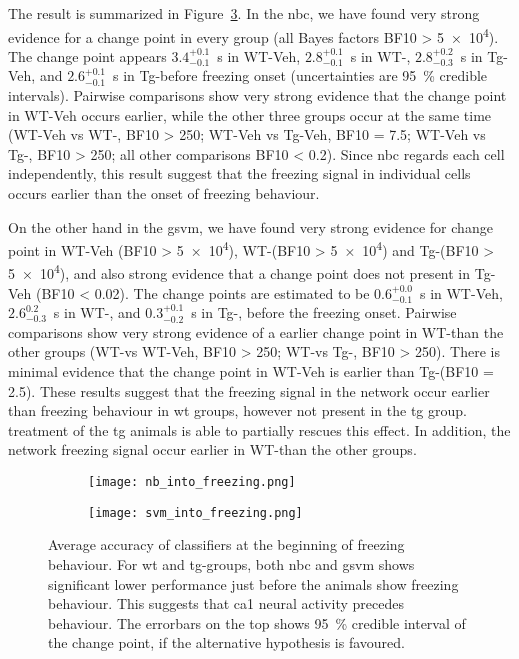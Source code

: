 The result is summarized in Figure~\ref{f.ad.into_f}. In the \gls{nbc}, we have found very strong evidence for a change point in every group (all Bayes factors BF10 > \num{5e4}). The change point appears $3.4_{-0.1}^{+0.1}$\SI{}{\s} in WT-Veh, $2.8_{-0.1}^{+0.1}$\SI{}{\second} in WT-\glu, $2.8_{-0.3}^{+0.2}$\SI{}{\second} in Tg-Veh, and $2.6_{-0.1}^{+0.1}$\SI{}{\second} in Tg-\glu before freezing onset (uncertainties are \SI{95}{\percent} credible intervals). Pairwise comparisons show very strong evidence that the change point in WT-Veh occurs earlier, while the other three groups occur at the same time (WT-Veh vs WT-\glu, BF10 > \num{250}; WT-Veh vs Tg-Veh, BF10 = \num{7.5}; WT-Veh vs Tg-\glu, BF10 > \num{250}; all other comparisons BF10 < \num{0.2}). Since \gls{nbc} regards each cell independently, this result suggest that the freezing signal in individual cells occurs earlier than the onset of freezing behaviour.

On the other hand in the \gls{gsvm}, we have found very strong evidence for change point in WT-Veh (BF10 > \num{5e4}), WT-\glu (BF10 > \num{5e4}) and Tg-\glu (BF10 > \num{5e4}), and also strong evidence that a change point does not present in Tg-Veh (BF10 < \num{0.02}). The change points are estimated to be $0.6_{-0.1}^{+0.0}$\SI{}{\s} in WT-Veh, $2.6_{-0.3}^{0.2}$\SI{}{\second} in WT-\glu, and $0.3_{-0.2}^{+0.1}$\SI{}{\s} in Tg-\glu, before the freezing onset. Pairwise comparisons show very strong evidence of a earlier change point in WT-\glu than the other groups (WT-\glu vs WT-Veh, BF10 > \num{250}; WT-\glu vs Tg-\glu, BF10 > \num{250}). There is minimal evidence that the change point in WT-Veh is earlier than Tg-\glu (BF10 = \num{2.5}). These results suggest that the freezing signal in the network occur earlier than freezing behaviour in \gls{wt} groups, however not present in the \gls{tg} group. \tglu treatment of the \gls{tg} animals is able to partially rescues this effect. In addition, the network freezing signal occur earlier in WT-\glu than the other groups.

\begin{figure}[h]
    \begin{subfigure}[h]{\textwidth}
        \texttt{[image: nb\_into\_freezing.png]}
        \caption{\label{f.ad.nb_into_f}}
    \end{subfigure}
    \begin{subfigure}[h]{\textwidth}
        \texttt{[image: svm\_into\_freezing.png]}
        \caption{\label{f.ad.svm_into_f}}
    \end{subfigure}
    \caption{Average accuracy of classifiers at the beginning of freezing behaviour. For \gls{wt} and \gls{tg}-\glu groups, both \gls{nbc} and \gls{gsvm} shows significant lower performance just before the animals show freezing behaviour. This suggests that \gls{ca1} neural activity precedes behaviour. The errorbars on the top shows \SI{95}{\percent} credible interval of the change point, if the alternative hypothesis is favoured. \label{f.ad.into_f}}
\end{figure}


